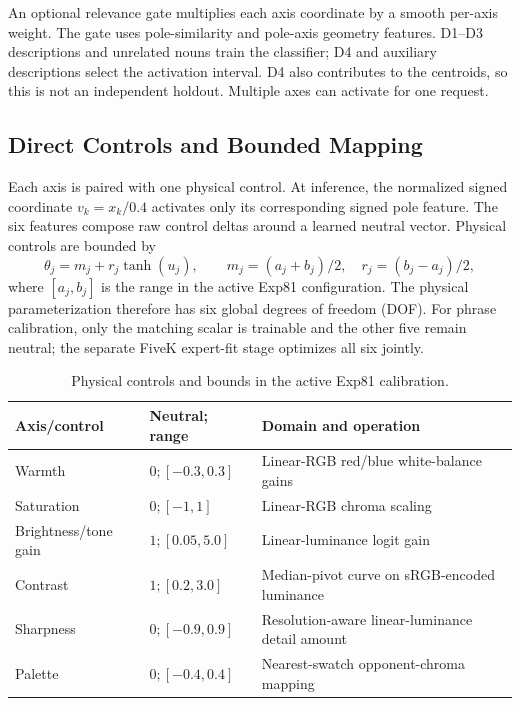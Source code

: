 \documentclass[journal]{IEEEtran}
\begin{document}
An optional relevance gate multiplies each axis coordinate by a smooth per-axis weight. The gate uses pole-similarity and pole-axis geometry features. D1--D3 descriptions and unrelated nouns train the classifier; D4 and auxiliary descriptions select the activation interval. D4 also contributes to the centroids, so this is not an independent holdout. Multiple axes can activate for one request.

\subsection{Direct Controls and Bounded Mapping}
Each axis is paired with one physical control. At inference, the normalized signed coordinate $v_k=x_k/0.4$ activates only its corresponding signed pole feature. The six features compose raw control deltas around a learned neutral vector. Physical controls are bounded by
\begin{equation}
 \theta_j=m_j+r_j\tanh(u_j),\qquad
 m_j=(a_j+b_j)/2,\quad r_j=(b_j-a_j)/2,
\end{equation}
where $[a_j,b_j]$ is the range in the active Exp81 configuration. The physical parameterization therefore has six global degrees of freedom (DOF). For phrase calibration, only the matching scalar is trainable and the other five remain neutral; the separate FiveK expert-fit stage optimizes all six jointly.

\begin{table}[t]
\caption{Physical controls and bounds in the active Exp81 calibration.}
\label{tab:controls}
\centering
\footnotesize
\begin{tabularx}{\columnwidth}{l l X}
\toprule
Axis/control & Neutral; range & Domain and operation \\
\midrule
Warmth & $0; [-0.3,0.3]$ & Linear-RGB red/blue white-balance gains \\
Saturation & $0; [-1,1]$ & Linear-RGB chroma scaling \\
Brightness/tone gain & $1; [0.05,5.0]$ & Linear-luminance logit gain \\
Contrast & $1; [0.2,3.0]$ & Median-pivot curve on sRGB-encoded luminance \\
Sharpness & $0; [-0.9,0.9]$ & Resolution-aware linear-luminance detail amount \\
Palette & $0; [-0.4,0.4]$ & Nearest-swatch opponent-chroma mapping \\
\bottomrule
\end{tabularx}
\end{table}
\end{document}

